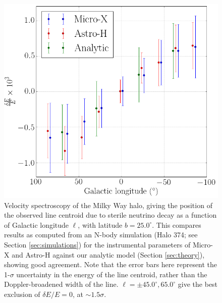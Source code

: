\documentclass[aps,prl,10pt,twocolumn,superscriptaddress,showpacs]{revtex4-1}
\begin{document}
{\begin{figure}[h!]
\centering
\includegraphics[width=1.0\columnwidth]{de_vs_l.png}
\caption{Velocity spectroscopy of the Milky Way halo, giving the position of the observed line centroid due to sterile
	neutrino decay as a function of Galactic longitude $\ell$, with latitude $b=25.0^\circ$. This
	compares results as computed from an N-body simulation (Halo 374; see Section \ref{sec:simulations}) for the
	instrumental parameters of Micro-X and Astro-H against our analytic model (Section
	\ref{sec:theory}), showing good agreement.	
	Note that the error bars here represent the 1-$\sigma$ uncertainty
in the energy of the line centroid, rather than the Doppler-broadened width of the line.
$\ell= \pm 45.0^\circ,65.0^\circ$ give the best exclusion of $\delta E/E=0$, at $\sim 1.5\sigma$.}
\label{fig:de_vs_l}
\end{figure}





}
\end{document}
